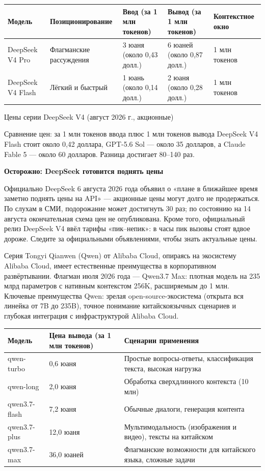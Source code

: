 \begin{center}
\begin{tabularx}{\linewidth}{|X|X|X|X|X|}
\hline
\textbf{Модель} & \textbf{Позиционирование} & \textbf{Ввод (за 1 млн токенов)} & \textbf{Вывод (за 1 млн токенов)} & \textbf{Контекстное окно} \tabularnewline
\hline
DeepSeek V4 Pro & Флагманские рассуждения & 3 юаня (около 0,43 долл.) & 6 юаней (около 0,87 долл.) & 1 млн токенов \tabularnewline
DeepSeek V4 Flash & Лёгкий и быстрый & 1 юань (около 0,14 долл.) & 2 юаня (около 0,28 долл.) & 1 млн токенов \tabularnewline
\hline
\end{tabularx}
\end{center}

\begin{center}\small\color{gray}Цены серии DeepSeek V4 (август 2026 г., акционные)\end{center}

Сравнение цен: за 1 млн токенов ввода плюс 1 млн токенов вывода DeepSeek V4 Flash стоит около 0,42 доллара, GPT-5.6 Sol — около 35 долларов, а Claude Fable 5 — около 60 долларов. Разница достигает 80–140 раз.

\textbf{Осторожно: DeepSeek готовится поднять цены}\par

Официально DeepSeek 6 августа 2026 года объявил о «плане в ближайшее время заметно поднять цены на API» — акционные цены могут долго не продержаться. По слухам в СМИ, подорожание может достигнуть 30 раз; по состоянию на 14 августа окончательная схема цен не опубликована. Кроме того, официальный релиз DeepSeek V4 ввёл тарифы «пик–непик»: в часы пик вызовы стоят вдвое дороже. Следите за официальными объявлениями, чтобы знать актуальные цены.


Серия Tongyi Qianwen (Qwen) от Alibaba Cloud, опираясь на экосистему Alibaba Cloud, имеет естественные преимущества в корпоративном развёртывании. Флагман июля 2026 года — Qwen3.7 Max: плотная модель на 235 млрд параметров с нативным контекстом 256K, расширяемым до 1 млн. Ключевые преимущества Qwen: зрелая open-source-экосистема (открыта вся линейка от 7B до 235B), точное понимание китайскоязычных сценариев и глубокая интеграция с инфраструктурой Alibaba Cloud.

\begin{center}
\begin{tabularx}{\linewidth}{|X|X|X|}
\hline
\textbf{Модель} & \textbf{Цена вывода (за 1 млн токенов)} & \textbf{Сценарии применения} \tabularnewline
\hline
qwen-turbo & 0,6 юаня & Простые вопросы-ответы, классификация текста, высокая нагрузка \tabularnewline
qwen-long & 2,0 юаня & Обработка сверхдлинного контекста (10 млн) \tabularnewline
qwen3.7-flash & 7,2 юаня & Обычные диалоги, генерация контента \tabularnewline
qwen3.7-plus & 12,0 юаня & Мультимодальность (изображения и видео), тексты на китайском \tabularnewline
qwen3.7-max & 36,0 юаней & Флагманские возможности для китайского языка, сложные задачи \tabularnewline
\hline
\end{tabularx}
\end{center}

